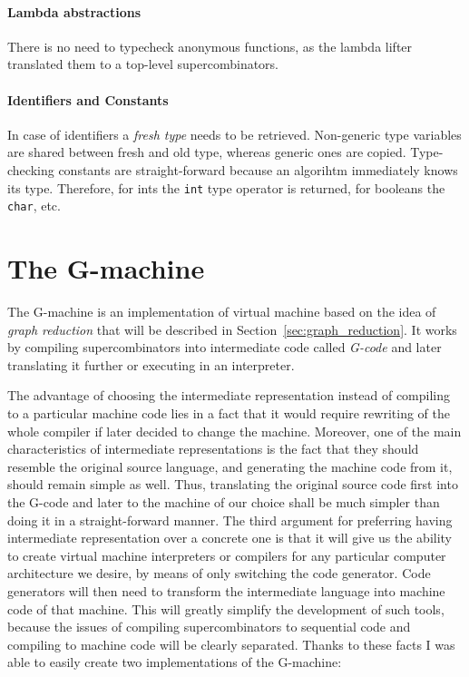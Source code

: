 \documentclass[12pt,a4paper]{report}
\begin{document}
\subsubsection{Lambda abstractions}
There is no need to typecheck anonymous functions, as the lambda lifter
translated them to a top-level supercombinators.

\subsubsection{Identifiers and Constants}
In case of identifiers a \textit{fresh type} needs to be retrieved. Non-generic
type variables are shared between fresh and old type, whereas generic ones are
copied. Type-checking constants are straight-forward because an algorihtm
immediately knows its type. Therefore, for ints the \texttt{int} type operator
is returned, for booleans the \texttt{char}, etc.

\chapter{The G-machine}
The G-machine is an implementation of virtual machine based on the idea of
\textit{graph reduction} that will be described in
Section~\ref{sec:graph_reduction}. It works by compiling supercombinators into
intermediate code called \textit{G-code} and later translating it further or
executing in an interpreter.

The advantage of choosing the intermediate representation instead of compiling
to a particular machine code lies in a fact that it would require rewriting of
the whole compiler if later decided to change the machine. Moreover, one of the
main characteristics of intermediate representations is the fact that they
should resemble the original source language, and generating the machine code
from it, should remain simple as well. Thus, translating the original source
code first into the G-code and later to the machine of our choice shall be much
simpler than doing it in a straight-forward manner. The third argument for
preferring having intermediate representation over a concrete one is that it
will give us the ability to create virtual machine interpreters or compilers
for any particular computer architecture we desire, by means of only switching
the code generator. Code generators will then need to transform the
intermediate language into machine code of that machine. This will greatly
simplify the development of such tools, because the issues of compiling
supercombinators to sequential code and compiling to machine code will be
clearly separated.  Thanks to these facts I was able to easily create two
implementations of the G-machine:
\end{document}
